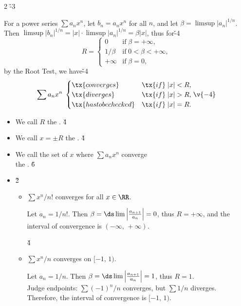 \documentclass[dvipdfmx,a4paper,titlepage,9pt]{jsarticle}
\begin{document}
\begin{multicols*}{2}
\v{-3}
\begin{Pfbox}
For a power series $\sum a_nx^n$, let $b_n=a_nx^n$ for all $n$, and let $\beta=\limsup|a_n|^{1/n}$. \\
Then $\limsup{}|b_n|^{1/n}=|x|\cdot\limsup{}|a_n|^{1/n}=\beta|x|$, thus for\v{-4}
$$R=\begin{cases}0 & \text{if}\;\beta=+\infty, \\ 1/\beta & \text{if}\;0<\beta<+\infty, \\+\infty & \text{if}\;\beta=0,\end{cases}$$
by the Root Test, we have\v{-4}
$$\sum a_nx^n\;\begin{cases}\tx{converges} & \tx{if}\;|x|<R,\\\tx{diverges} & \tx{if}\;|x|>R,\\\tx{has to be checked} & \tx{if}\;|x|=R.\end{cases}\v{-4}$$
\end{Pfbox}
\begin{itemize}[label={-}]
\item We call $R$ the . \v4
\item We call $x=\pm R$ the . \v4
\item We call the set of $x$ where $\sum a_nx^n$ converge \\
      the . \v6
 
\item {} \v2
\begin{itemize}[label={$\cdot$}]
\setlength{\leftskip}{-10pt}
\item $\sum x^n\!/n!$ converges for all $x\in\RR$.
\begin{solbox}
Let $a_n=1/n!$. Then $\beta=\ds\lim\left|\frac{a_{n+1}}{a_n}\right|=0$, thus $R=+\infty$, and the interval of convergence is $(-\infty,\,+\infty)$.
\end{solbox} \v4
\item $\sum x^n\!/n$ converges on $[-1,\,1)$.
\begin{solbox}
Let $a_n=1/n$. Then $\beta=\ds\lim\left|\frac{a_{n+1}}{a_n}\right|=1$, thus $R=1$. \\
Judge endpoints: $\sum (-1)^n\!/n$ converges, but $\sum1/n$ diverges. \\
Therefore, the interval of convergence is $[-1,\,1)$.
\end{solbox}
\end{itemize}
\end{itemize}


\end{multicols*}
\end{document}

